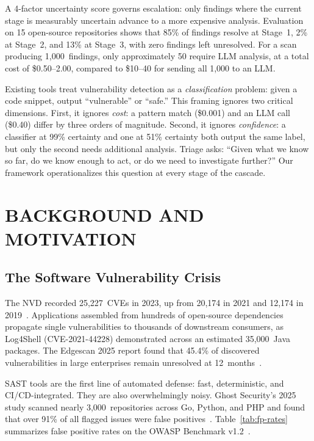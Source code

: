 A 4-factor uncertainty score governs escalation: only findings where the current stage is measurably uncertain advance to a more expensive analysis. Evaluation on 15 open-source repositories shows that 85\% of findings resolve at Stage~1, 2\% at Stage~2, and 13\% at Stage~3, with zero findings left unresolved. For a scan producing 1,000~findings, only approximately 50 require LLM analysis, at a total cost of \$0.50--2.00, compared to \$10--40 for sending all 1,000 to an LLM.

Existing tools treat vulnerability detection as a \textit{classification} problem: given a code snippet, output ``vulnerable'' or ``safe.'' This framing ignores two critical dimensions. First, it ignores \textit{cost}: a pattern match (\$0.001) and an LLM call (\$0.40) differ by three orders of magnitude. Second, it ignores \textit{confidence}: a classifier at 99\% certainty and one at 51\% certainty both output the same label, but only the second needs additional analysis. Triage asks: ``Given what we know so far, do we know enough to act, or do we need to investigate further?'' Our framework operationalizes this question at every stage of the cascade.


\section{\uppercase{Background and Motivation}}

\subsection{The Software Vulnerability Crisis}

The NVD recorded 25,227~CVEs in 2023, up from 20,174 in 2021 and 12,174 in 2019~\cite{nvd2023}. Applications assembled from hundreds of open-source dependencies propagate single vulnerabilities to thousands of downstream consumers, as Log4Shell (CVE-2021-44228) demonstrated across an estimated 35,000~Java packages. The Edgescan 2025 report found that 45.4\% of discovered vulnerabilities in large enterprises remain unresolved at 12~months~\cite{edgescan2025}.

SAST tools are the first line of automated defense: fast, deterministic, and CI/CD-integrated. They are also overwhelmingly noisy. Ghost Security's 2025 study scanned nearly 3,000~repositories across Go, Python, and PHP and found that over 91\% of all flagged issues were false positives~\cite{ghostsecurity2025}. Table~\ref{tab:fp-rates} summarizes false positive rates on the OWASP Benchmark v1.2~\cite{siftingnoise2026}.

